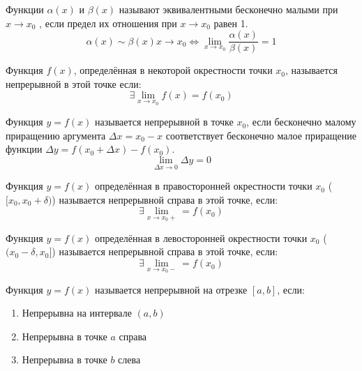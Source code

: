 \begin{definition} \label{def:44}
    Функции $\alpha(x)$ и $\beta(x)$ называют эквивалентными бесконечно малыми при $x \to x_0$ , если предел их отношения при $x \to x_0$ равен 1. \[
        \alpha(x) \sim \beta(x) x \to x_0 \iff \lim_{x \to x_0} \frac{\alpha(x)}{\beta(x)} = 1
    \]
\end{definition}


\begin{definition} \label{def:50}
    Функция $f(x)$, определённая в некоторой окрестности точки $x_0$, называется непрерывной в этой точке если: \[
        \exists \lim_{x \to x_0} f(x) = f(x_0)
    \]
\end{definition}


\begin{definition} \label{def:51}
    Функция $y = f(x)$ называется непрерывной в точке $x_0$, если бесконечно малому приращению аргумента $\Delta x = x_0 - x$  соответствует бесконечно малое приращение функции $\Delta y = f(x_0 + \Delta x) - f(x_0)$. \[
        \lim_{\Delta x \to 0} \Delta y = 0
    \] 
\end{definition}


\begin{definition}
    Функция $y = f(x)$ определённая в правосторонней окрестности точки $x_0$ ($[x_0, x_0 + \delta)$) называется непрерывной справа в этой точке, если: \[
        \exists \lim_{x \to x_0+} = f(x_0)
    \] 
\end{definition}


\begin{definition}
    Функция $y = f(x)$ определённая в левосторонней окрестности точки $x_0$ ($(x_0 - \delta, x_0]$) называется непрерывной справа в этой точке, если: \[
        \exists \lim_{x \to x_0-} = f(x_0)
    \] 
\end{definition}


\begin{definition} \label{def:55}
    Функция $y = f(x) $ называется непрерывной на отрезке $[a, b]$, если:
    \begin{enumerate}
        \item Непрерывна на интервале $(a, b)$
        \item Непрерывна в точке $a$ справа
        \item Непрерывна в точке $b$ слева
    \end{enumerate}
\end{definition}


